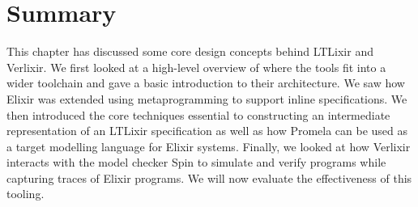\section{Summary}
This chapter has discussed some core design concepts behind LTLixir and Verlixir. We first looked at a high-level overview of where the tools fit into a wider toolchain and gave a basic introduction to their architecture. We saw how Elixir was extended using metaprogramming to support inline specifications. We then introduced the core techniques essential to constructing an intermediate representation of an LTLixir specification as well as how Promela can be used as a target modelling language for Elixir systems. Finally, we looked at how Verlixir interacts with the model checker Spin to simulate and verify programs while capturing traces of Elixir programs. We will now evaluate the effectiveness of this tooling.
